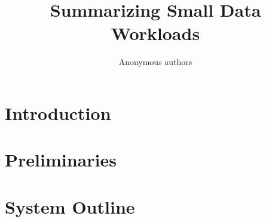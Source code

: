 \documentclass{vldb}
\begin{document}
\title{Summarizing Small Data Workloads} 


\author{
    Anonymous authors
}

\maketitle



\begin{abstract}

\end{abstract}




\section{Introduction}
\label{sec:intro}  %


\section{Preliminaries}
\label{sec:background}


\section{System Outline}
\label{sec:systemoutline}
%



%

%
\end{document}
